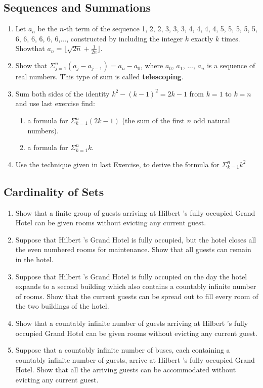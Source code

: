 \documentclass{sig-alternate-05-2015}
\begin{document}
\subsection{Sequences and Summations}
\begin{enumerate}
\item Let $a_n$ be the $n$-th term of the sequence 1, 2, 2, 3, 3, 3, 4, 4, 4, 4, 5, 5, 5, 5, 5, 6, 6, 6, 6, 6, 6,..., constructed by including the integer $k$ exactly $k$ times. Showthat $a_n = \lfloor \sqrt{2n}+ \frac{1}{2n} \rfloor$.

\item Show that $\Sigma^n_{j = 1}(a_j - a_{j - 1}) = a_n - a_0$, where
$a_0$, $a_1$, ..., $a_n$ is a sequence of real numbers. This type of sum is called \textbf{telescoping}.

\item Sum both sides of the identity $k^2 - (k - 1)^2 = 2k - 1$ from $k = 1$ to $k = n$ and use last exercise find:
\begin{enumerate}
	\item a formula for $\Sigma^n_{k = 1}(2k - 1)$ (the sum of the first $n$ odd natural numbers).
	\item a formula for $\Sigma^n_{k = 1} k$.
\end{enumerate}

\item Use the technique given in last Exercise, to derive the formula for $\Sigma^n_{k = 1} k^2$

\end{enumerate}
\subsection{Cardinality of Sets}
\begin{enumerate}
\item Show that a finite group of guests arriving at Hilbert \textquoteright s
fully occupied Grand Hotel can be given rooms without
evicting any current guest.
\item Suppose that Hilbert \textquoteright s Grand Hotel is fully occupied, but
the hotel closes all the even numbered rooms for maintenance.
Show that all guests can remain in the hotel.
\item Suppose that Hilbert \textquoteright s Grand Hotel is fully occupied on
the day the hotel expands to a second building which also
contains a countably infinite number of rooms. Show that
the current guests can be spread out to fill every room of
the two buildings of the hotel.
\item Show that a countably infinite number of guests arriving
at Hilbert \textquoteright s fully occupied Grand Hotel can be given
rooms without evicting any current guest.
\item Suppose that a countably infinite number of buses, each
containing a countably infinite number of guests, arrive
at Hilbert \textquoteright s fully occupied Grand Hotel. Show that all the
arriving guests can be accommodated without evicting
any current guest.
\end{enumerate}
\end{document}
